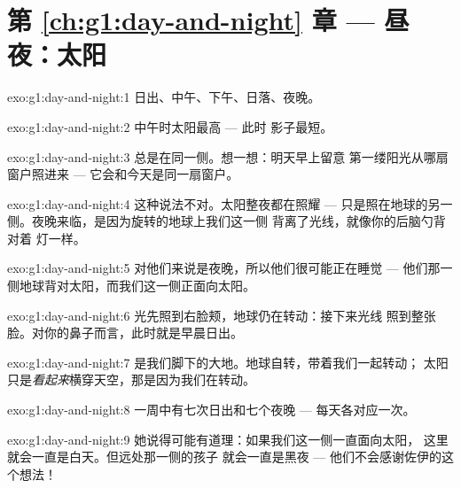 \section*{第 \ref{ch:g1:day-and-night} 章 --- 昼夜：太阳}

\begin{solution}{exo:g1:day-and-night:1}
日出、中午、下午、日落、夜晚。
\end{solution}

\begin{solution}{exo:g1:day-and-night:2}
中午时太阳最高 --- 此时
影子最短。
\end{solution}

\begin{solution}{exo:g1:day-and-night:3}
总是在同一侧。想一想：明天早上留意
第一缕阳光从哪扇窗户照进来 ---
它会和今天是同一扇窗户。
\end{solution}

\begin{solution}{exo:g1:day-and-night:4}
这种说法不对。太阳整夜都在照耀 ---
只是照在地球的另一侧。夜晚来临，是因为旋转的地球上我们这一侧
背离了光线，就像你的后脑勺背对着
灯一样。
\end{solution}

\begin{solution}{exo:g1:day-and-night:5}
对他们来说是夜晚，所以他们很可能正在睡觉 ---
他们那一侧地球背对太阳，而我们这一侧正面向太阳。
\end{solution}

\begin{solution}{exo:g1:day-and-night:6}
光先照到右脸颊，地球仍在转动：接下来光线
照到整张脸。对你的鼻子而言，此时就是早晨日出。
\end{solution}

\begin{solution}{exo:g1:day-and-night:7}
是我们脚下的大地。地球自转，带着我们一起转动；
太阳只是\emph{看起来}横穿天空，那是因为我们在转动。
\end{solution}

\begin{solution}{exo:g1:day-and-night:8}
一周中有七次日出和七个夜晚 ---
每天各对应一次。
\end{solution}

\begin{solution}{exo:g1:day-and-night:9}
她说得可能有道理：如果我们这一侧一直面向太阳，
这里就会一直是白天。但远处那一侧的孩子
就会一直是黑夜 --- 他们不会感谢佐伊的这个想法！
\end{solution}
